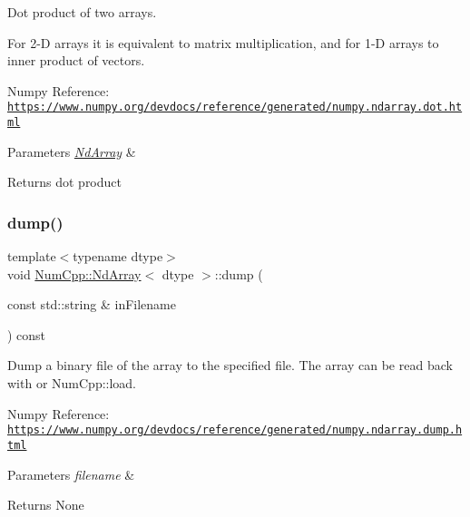 Dot product of two arrays.

For 2-\/D arrays it is equivalent to matrix multiplication, and for 1-\/D arrays to inner product of vectors.

Numpy Reference\+: \href{https://www.numpy.org/devdocs/reference/generated/numpy.ndarray.dot.html}{\tt https\+://www.\+numpy.\+org/devdocs/reference/generated/numpy.\+ndarray.\+dot.\+html}


\begin{DoxyParams}{Parameters}
{\em \mbox{\hyperlink{class_num_cpp_1_1_nd_array}{Nd\+Array}}} & \\
\hline
\end{DoxyParams}
\begin{DoxyReturn}{Returns}
dot product 
\end{DoxyReturn}
\mbox{\label{class_num_cpp_1_1_nd_array_a406dd6205b385227aa1699272702bb87}} 
\subsubsection{\texorpdfstring{dump()}{dump()}}
{\footnotesize\ttfamily template$<$typename dtype$>$ \\
void \mbox{\hyperlink{class_num_cpp_1_1_nd_array}{Num\+Cpp\+::\+Nd\+Array}}$<$ dtype $>$\+::dump (\begin{DoxyParamCaption}\item[{const std\+::string \&}]{in\+Filename }\end{DoxyParamCaption}) const\hspace{0.3cm}{\ttfamily [inline]}}

Dump a binary file of the array to the specified file. The array can be read back with or Num\+Cpp\+::load.

Numpy Reference\+: \href{https://www.numpy.org/devdocs/reference/generated/numpy.ndarray.dump.html}{\tt https\+://www.\+numpy.\+org/devdocs/reference/generated/numpy.\+ndarray.\+dump.\+html}


\begin{DoxyParams}{Parameters}
{\em filename} & \\
\hline
\end{DoxyParams}
\begin{DoxyReturn}{Returns}
None 
\end{DoxyReturn}
\mbox{\label{class_num_cpp_1_1_nd_array_a7c6dfc0aa51f8e7347e84e7a9cca9e5c}} 
